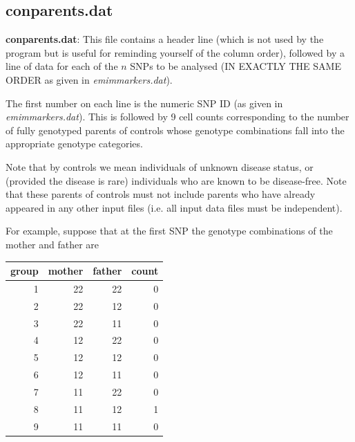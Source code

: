 \documentclass[a4paper,12pt]{article}
\begin{document}
\subsection{conparents.dat}
\label{conparents}

{\bf conparents.dat}: This file contains a header line (which is not used by the program but is useful for reminding yourself of the column order), followed by a line of data for each of the $n$ SNPs to be analysed (IN EXACTLY THE SAME ORDER as given in {\it emimmarkers.dat}). 

The first number on each line is the numeric SNP ID (as given in {\it emimmarkers.dat}). This is followed by 9 cell counts corresponding to the number of fully genotyped parents of controls whose genotype combinations fall into the appropriate genotype categories. 

Note that by controls we mean individuals of unknown disease status, or (provided the disease is rare) individuals who are known to be disease-free. Note that these parents of controls must not include parents who have already appeared in any other input files (i.e. all input data files must be independent). 

For example, suppose that at the first SNP the genotype combinations of the mother and father are 

{\begin{center}\begin{tabular}{rrrr}
group  & mother  & father  & count\\
\hline
1  & 22  & 22  & 0\\
2  & 22  & 12  & 0\\
3  & 22  & 11  & 0\\
4  & 12  & 22  & 0\\
5  & 12  & 12  & 0\\
6  & 12  & 11  & 0\\
7  & 11  & 22  & 0\\
8  & 11  & 12  & 1\\
9  & 11  & 11  & 0\\
\end{tabular}\end{center}}
\end{document}
